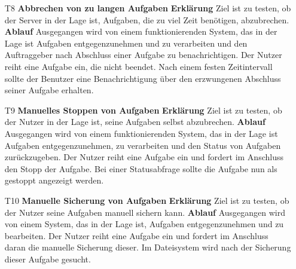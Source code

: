 \documentclass[a4paper,12pt]{article}
\begin{document}
\begin{itemize}

\item[T8] \textbf{Abbrechen von zu langen Aufgaben }
\subitem \textbf{Erklärung} Ziel ist zu testen, ob der Server in der Lage ist, Aufgaben, die zu viel Zeit benötigen, abzubrechen.
\subitem \textbf{Ablauf} Ausgegangen wird von einem funktionierenden System, das in der Lage ist Aufgaben entgegenzunehmen und zu verarbeiten und den Auftraggeber nach Abschluss einer Aufgabe zu benachrichtigen.
Der Nutzer reiht eine Aufgabe ein, die nicht beendet. Nach einem festen Zeitintervall sollte der Benutzer eine Benachrichtigung über den erzwungenen Abschluss seiner Aufgabe erhalten.

\item[T9] \textbf{Manuelles Stoppen von Aufgaben }
\subitem \textbf{Erklärung} Ziel ist zu testen, ob der Nutzer in der Lage ist, seine Aufgaben selbst abzubrechen.
\subitem \textbf{Ablauf} Ausgegangen wird von einem funktionierenden System, das in der Lage ist Aufgaben entgegenzunehmen, zu verarbeiten und den Status von Aufgaben zurückzugeben.
Der Nutzer reiht eine Aufgabe ein und fordert im Anschluss den Stopp der Aufgabe. Bei einer Statusabfrage sollte die Aufgabe nun als gestoppt angezeigt werden.

\item[T10] \textbf{Manuelle Sicherung von Aufgaben}
\subitem \textbf{Erklärung} Ziel ist zu testen, ob der Nutzer seine Aufgaben manuell sichern kann.
\subitem \textbf{Ablauf} Ausgegangen wird von einem System, das in der Lage ist, Aufgaben entgegenzunehmen und zu bearbeiten.
Der Nutzer reiht eine Aufgabe ein und fordert im Anschluss daran die manuelle Sicherung dieser. Im Dateisystem wird nach der Sicherung dieser Aufgabe gesucht.

\end{itemize}

\clearpage
\printnoidxglossaries
\end{document}
